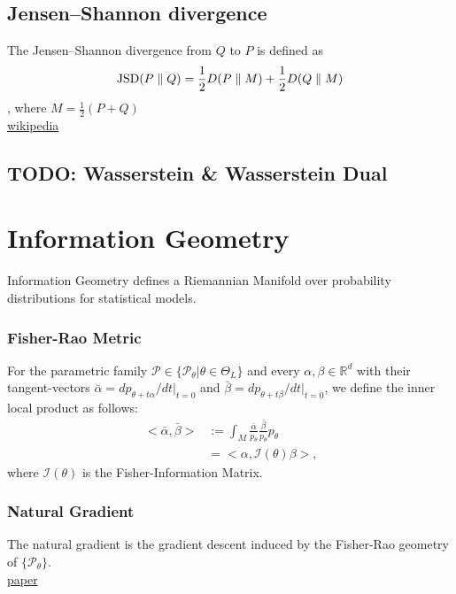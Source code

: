 \subsection{Jensen–Shannon divergence}
The Jensen–Shannon divergence from $Q$ to $P$ is defined as
\begin{align*}
	{{\rm {JSD}}}(P\parallel Q)={\frac  {1}{2}}D(P\parallel M)+{\frac  {1}{2}}D(Q\parallel M)
\end{align*}, where $M={\frac  {1}{2}}(P+Q)$\\
\href{https://en.wikipedia.org/wiki/Jensen–Shannon_divergence}{wikipedia}

\subsection{TODO: Wasserstein \& Wasserstein Dual}

\section{Information Geometry}
Information Geometry defines a Riemannian Manifold over probability distributions for statistical models.\\
\subsubsection{Fisher-Rao Metric}
For the parametric family $\mathcal{P} \in \{ \mathcal{P}_\theta | \theta \in \Theta_L\}$ and every $\alpha, \beta \in \mathbb{R}^d$ with their tangent-vectors $\bar{\alpha}=dp_{\theta + t\alpha}/dt|_{t=0}$ and $\bar{\beta}=dp_{\theta + t\beta}/dt|_{t=0}$, we define the inner local product as follows:
\begin{align*}
	<\bar{\alpha}, \bar{\beta}> &:= \int_M\frac{\bar{\alpha}}{p_\theta}\frac{\bar{\beta}}{p_\theta}p_\theta\\
	&=<\alpha, \mathcal{I}(\theta)\beta>\text{,}
\end{align*}
where $\mathcal{I}(\theta)$ is the Fisher-Information Matrix.
\subsubsection{Natural Gradient}
The natural gradient is the gradient descent induced by the Fisher-Rao geometry of $\{\mathcal{P}_\theta \}$.\\
\href{https://arxiv.org/abs/1711.01530}{paper}